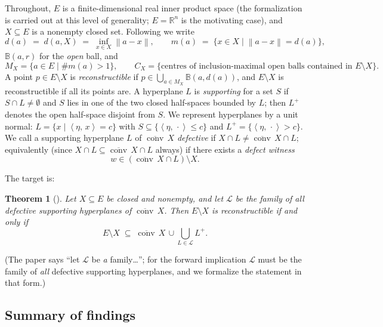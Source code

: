 \documentclass[11pt]{article}
\newtheorem{theorem}{Theorem}[section]
\theoremstyle{remark}
\newcommand{\R}{\mathbb{R}}
\newcommand{\B}{\mathbb{B}}
\newcommand{\X}{X}
\newcommand{\conv}{\operatorname{conv}}
\newcommand{\cconv}[1]{\overline{\conv}\,#1}
\newcommand{\sca}[2]{\left\langle #1,\, #2\right\rangle}
\newcommand{\norm}[1]{\left\lVert #1\right\rVert}
\newcommand{\Mx}{M_{\X}}
\newcommand{\Cx}{C_{\X}}
\begin{document}
Throughout, $E$ is a finite-dimensional real inner product space (the formalization is carried
out at this level of generality; $E=\R^n$ is the motivating case), and $\X\subseteq E$ is a
nonempty closed set. Following \cite{Bia} we write
\[
 d(a) \;=\; d(a,\X)\;=\;\inf_{x\in \X}\norm{a-x},\qquad
 m(a)\;=\;\{x\in \X \mid \norm{a-x}=d(a)\},
\]
$\B(a,r)$ for the \emph{open} ball, and
\[
 \Mx=\{a\in E\mid \#m(a)>1\},\qquad
 \Cx=\{\text{centres of inclusion-maximal open balls contained in } E\setminus \X\}.
\]
A point $p\in E\setminus\X$ is \emph{reconstructible} if
$p\in\bigcup_{a\in \Mx}\B(a,d(a))$, and $E\setminus\X$ is reconstructible if all its points are.
A hyperplane $L$ is \emph{supporting} for a set $S$ if $S\cap L\neq\emptyset$ and $S$ lies in one
of the two closed half-spaces bounded by $L$; then $L^{+}$ denotes the open half-space disjoint
from $S$. We represent hyperplanes by a unit normal: $L=\{x\mid \sca{\eta}{x}=c\}$ with
$S\subseteq\{\sca{\eta}{\cdot}\le c\}$ and $L^{+}=\{\sca{\eta}{\cdot}>c\}$. We call a supporting
hyperplane $L$ of $\cconv \X$ \emph{defective} if $\X\cap L\neq \cconv \X\cap L$; equivalently
(since $\X\cap L\subseteq\cconv\X\cap L$ always) if there exists a \emph{defect witness}
\[
 w\in (\cconv \X\cap L)\setminus \X .
\]

The target is:

\begin{theorem}[{\cite[Theorem 6]{Bia}}]\label{thm:main}
Let $\X\subseteq E$ be closed and nonempty, and let $\mathcal L$ be the family of all defective
supporting hyperplanes of $\cconv \X$. Then $E\setminus\X$ is reconstructible if and only if
\[
E\setminus\X\;\subseteq\; \cconv \X\,\cup \bigcup_{L\in\mathcal L} L^{+}.
\]
\end{theorem}

(The paper says ``let $\mathcal L$ be \emph{a} family\dots''; for the forward implication
$\mathcal L$ must be the family of \emph{all} defective supporting hyperplanes, and we formalize
the statement in that form.)

\subsection*{Summary of findings}
\end{document}
